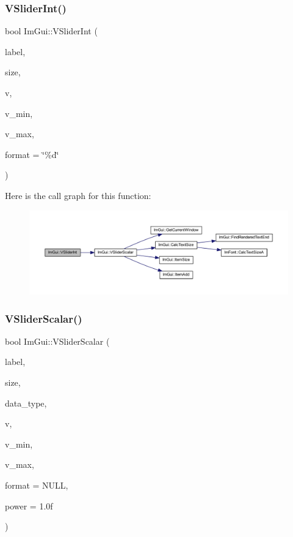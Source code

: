 \subsubsection{\texorpdfstring{V\+Slider\+Int()}{VSliderInt()}}
{\footnotesize\ttfamily bool Im\+Gui\+::\+V\+Slider\+Int (\begin{DoxyParamCaption}\item[{const char $\ast$}]{label,  }\item[{const \mbox{\hyperlink{struct_im_vec2}{Im\+Vec2}} \&}]{size,  }\item[{int $\ast$}]{v,  }\item[{int}]{v\+\_\+min,  }\item[{int}]{v\+\_\+max,  }\item[{const char $\ast$}]{format = {\ttfamily \char`\"{}\%d\char`\"{}} }\end{DoxyParamCaption})}

Here is the call graph for this function\+:
\nopagebreak
\begin{figure}[H]
\begin{center}
\leavevmode
\includegraphics[width=350pt]{namespace_im_gui_a8adb506ea3ac2648a1f7655297b593c8_cgraph}
\end{center}
\end{figure}
\mbox{\label{namespace_im_gui_a8cf70d5b37efd3571df69472bc9c92bb}} 
\subsubsection{\texorpdfstring{V\+Slider\+Scalar()}{VSliderScalar()}}
{\footnotesize\ttfamily bool Im\+Gui\+::\+V\+Slider\+Scalar (\begin{DoxyParamCaption}\item[{const char $\ast$}]{label,  }\item[{const \mbox{\hyperlink{struct_im_vec2}{Im\+Vec2}} \&}]{size,  }\item[{\mbox{\hyperlink{imgui_8h_a4cfa8697a3d76722fff83eb18922e9d5}{Im\+Gui\+Data\+Type}}}]{data\+\_\+type,  }\item[{void $\ast$}]{v,  }\item[{const void $\ast$}]{v\+\_\+min,  }\item[{const void $\ast$}]{v\+\_\+max,  }\item[{const char $\ast$}]{format = {\ttfamily NULL},  }\item[{float}]{power = {\ttfamily 1.0f} }\end{DoxyParamCaption})}


